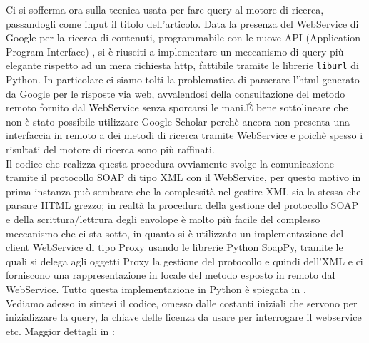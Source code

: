 Ci si sofferma ora sulla tecnica usata per fare query al motore di ricerca, passandogli come input il titolo dell'articolo. Data la presenza del WebService di Google per la ricerca di contenuti, programmabile con le nuove API (Application Program Interface) \cite{GWS}, si è riusciti a implementare un meccanismo di query più elegante rispetto ad un mera richiesta http, fattibile tramite le librerie \texttt{liburl} di Python. In particolare ci siamo tolti la problematica di parserare l'html generato da Google per le risposte via web, avvalendosi della consultazione del metodo remoto fornito dal WebService senza sporcarsi le mani.\'E bene sottolineare che non è stato possibile utilizzare Google Scholar perchè ancora non presenta una interfaccia in remoto a dei metodi di ricerca tramite WebService e poichè spesso i risultati del motore di ricerca sono più raffinati.\\
Il codice che realizza questa procedura ovviamente svolge la comunicazione tramite il protocollo SOAP di tipo XML con il WebService, per questo motivo in prima instanza può sembrare che la complessità nel gestire XML sia la stessa che parsare HTML grezzo; in realtà la procedura della gestione del protocollo SOAP e della scrittura/lettrura degli envolope è molto più facile del complesso meccanismo che ci sta sotto, in quanto si è utilizzato un implementazione del client WebService di tipo Proxy usando le librerie Python SoapPy, tramite le quali si delega agli oggetti Proxy la gestione del protocollo e quindi dell'XML e ci forniscono una rappresentazione in locale del metodo esposto in remoto dal WebService. Tutto questa implementazione in Python è spiegata in \cite{ibm-py-ws}.\\
Vediamo adesso in sintesi il codice, omesso dalle costanti iniziali che servono per inizializzare la query, la chiave delle licenza da usare per interrogare il webservice etc. Maggior dettagli in \cite{ibm-py-ws} :


